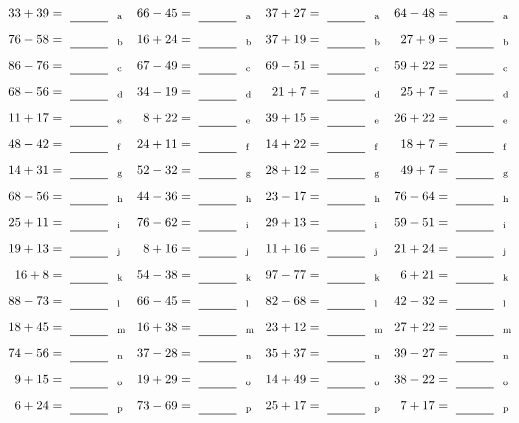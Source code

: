 \documentclass
[
  draft    = true,
  fontsize = 11pt,
  parskip  = half-
]
{scrartcl}
\begin{document}
\clearpage
\begin{align*}
    \pline{33+39}&=\rline{a}
  & \pline{66-45}&=\rline{a}
  & \pline{37+27}&=\rline{a}
  & \pline{64-48}&=\rline{a} \\[1ex]
    \pline{76-58}&=\rline{b}
  & \pline{16+24}&=\rline{b}
  & \pline{37+19}&=\rline{b}
  & \pline{27+9}&=\rline{b} \\[1ex]
    \pline{86-76}&=\rline{c}
  & \pline{67-49}&=\rline{c}
  & \pline{69-51}&=\rline{c}
  & \pline{59+22}&=\rline{c} \\[1ex]
    \pline{68-56}&=\rline{d}
  & \pline{34-19}&=\rline{d}
  & \pline{21+7}&=\rline{d}
  & \pline{25+7}&=\rline{d} \\[1ex]
    \pline{11+17}&=\rline{e}
  & \pline{8+22}&=\rline{e}
  & \pline{39+15}&=\rline{e}
  & \pline{26+22}&=\rline{e} \\[1ex]
    \pline{48-42}&=\rline{f}
  & \pline{24+11}&=\rline{f}
  & \pline{14+22}&=\rline{f}
  & \pline{18+7}&=\rline{f} \\[1ex]
    \pline{14+31}&=\rline{g}
  & \pline{52-32}&=\rline{g}
  & \pline{28+12}&=\rline{g}
  & \pline{49+7}&=\rline{g} \\[1ex]
    \pline{68-56}&=\rline{h}
  & \pline{44-36}&=\rline{h}
  & \pline{23-17}&=\rline{h}
  & \pline{76-64}&=\rline{h} \\[1ex]
    \pline{25+11}&=\rline{i}
  & \pline{76-62}&=\rline{i}
  & \pline{29+13}&=\rline{i}
  & \pline{59-51}&=\rline{i} \\[1ex]
    \pline{19+13}&=\rline{j}
  & \pline{8+16}&=\rline{j}
  & \pline{11+16}&=\rline{j}
  & \pline{21+24}&=\rline{j} \\[1ex]
    \pline{16+8}&=\rline{k}
  & \pline{54-38}&=\rline{k}
  & \pline{97-77}&=\rline{k}
  & \pline{6+21}&=\rline{k} \\[1ex]
    \pline{88-73}&=\rline{l}
  & \pline{66-45}&=\rline{l}
  & \pline{82-68}&=\rline{l}
  & \pline{42-32}&=\rline{l} \\[1ex]
    \pline{18+45}&=\rline{m}
  & \pline{16+38}&=\rline{m}
  & \pline{23+12}&=\rline{m}
  & \pline{27+22}&=\rline{m} \\[1ex]
    \pline{74-56}&=\rline{n}
  & \pline{37-28}&=\rline{n}
  & \pline{35+37}&=\rline{n}
  & \pline{39-27}&=\rline{n} \\[1ex]
    \pline{9+15}&=\rline{o}
  & \pline{19+29}&=\rline{o}
  & \pline{14+49}&=\rline{o}
  & \pline{38-22}&=\rline{o} \\[1ex]
    \pline{6+24}&=\rline{p}
  & \pline{73-69}&=\rline{p}
  & \pline{25+17}&=\rline{p}
  & \pline{7+17}&=\rline{p}
\end{align*}
\end{document}
